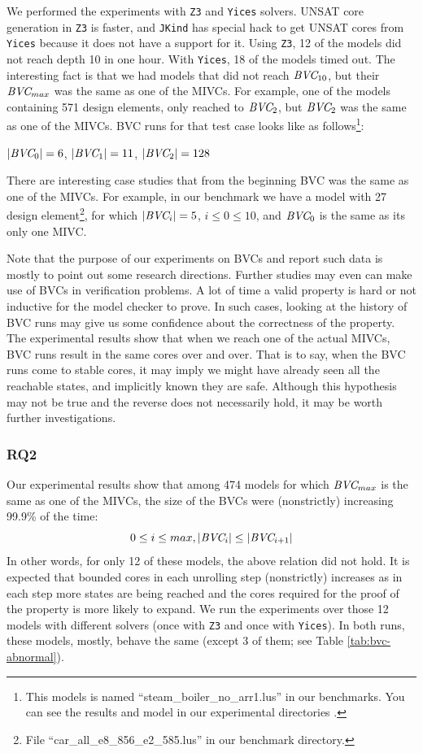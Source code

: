 We performed the experiments with \texttt{Z3} and \texttt{Yices} solvers. UNSAT core generation in \texttt{Z3} is faster, and \texttt{JKind} has special hack to get UNSAT cores from \texttt{Yices} because it does not have a support for it. Using \texttt{Z3}, 12 of the models did not reach depth 10 in one hour. With \texttt{Yices}, 18 of the models timed out. The interesting fact is that we had models that did not reach $\textit{BVC} _{10}$, but their $\textit{BVC} _{max}$ was the same as one of the MIVCs. For example, one of the models containing 571 design elements, only reached to $\textit{BVC} _{2}$, but $\textit{BVC} _{2}$ was the same as one of the MIVCs. 
BVC runs for that test case looks like as follows\footnote{This models is named ``steam\_boiler\_no\_arr1.lus'' in our benchmarks. You can see the results and model in our experimental directories \cite{expr}.}:

$|\textit{BVC} _{0}| = 6$, $|\textit{BVC} _{1}| = 11$, $|\textit{BVC} _{2}| = 128$ 

There are interesting case studies that from the beginning BVC was the same as one of the MIVCs. For example, in our benchmark we have a model with 27 design element\footnote{File ``car\_all\_e8\_856\_e2\_585.lus'' in our benchmark directory.}, for which $|\textit{BVC} _{i}| = 5$, $i \leq 0 \le 10$, and $\textit{BVC} _{0}$ is the same as its only one MIVC.

Note that the purpose of our experiments on BVCs and report such data is mostly to point out some research directions. Further studies may even can make use of BVCs in verification problems. A lot of time a valid property is hard or not inductive for the model checker to prove. In such cases, looking at the history of BVC runs may give us some confidence about the correctness of the property. The experimental results show that when we reach one of the actual MIVCs, BVC runs result in the same cores over and over. That is to say, when the BVC runs come to stable cores, it may imply we might have already seen all the reachable states, and implicitly known they are safe. Although this hypothesis may not be true and the reverse does not necessarily hold, it may be worth further investigations.

\vspace{0.1in}
\subsubsection{RQ2}
Our experimental results show that among 474 models for which $\textit{BVC} _{max}$ is the same as one of the MIVCs, the size of the BVCs were (nonstrictly) increasing 99.9\% of the time:
      $$ 0 \leq i \le max, |\textit{BVC} _{i}| \leq |\textit{BVC} _{i+1}|$$
      In other words, for only 12 of these models, the above relation did not hold.
      It is expected that bounded cores in each unrolling step (nonstrictly) increases as in each step more states are being reached and the cores required for the proof of the property is more likely to expand.
      We run the experiments over those 12 models with different solvers (once with \texttt{Z3} and once with \texttt{Yices}). In both runs, these models, mostly, behave the same (except 3 of them; see Table \ref{tab:bvc-abnormal}).

